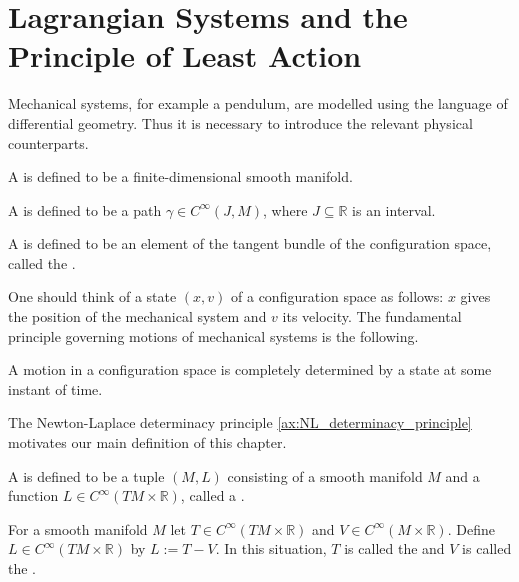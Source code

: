 \section*{Lagrangian Systems and the Principle of Least Action}
Mechanical systems, for example a pendulum, are modelled using the language of differential geometry. Thus it is necessary to introduce the relevant physical counterparts. 

\begin{definition}
	A  is defined to be a finite-dimensional smooth manifold.
\end{definition}

\begin{definition}[Motion]
	A  is defined to be a path $\gamma \in C^\infty(J, M)$, where $J \subseteq \mathbb{R}$ is an interval.
\end{definition}

\begin{definition}[State]
	A  is defined to be an element of the tangent bundle of the configuration space, called the .
\end{definition}

One should think of a state $(x,v)$ of a configuration space as follows: $x$ gives the position of the mechanical system and $v$ its velocity. The fundamental principle governing motions of mechanical systems is the following.

\begin{axiom}
	\label{ax:NL_determinacy_principle}
	A motion in a configuration space is completely determined by a state at some instant of time.
\end{axiom}

The Newton-Laplace determinacy principle \ref{ax:NL_determinacy_principle} motivates our main definition of this chapter.

\begin{definition}
	A  is defined to be a tuple $(M,L)$ consisting of a smooth manifold $M$ and a function $L \in C^\infty(TM \times \mathbb{R})$, called a .
\end{definition}

\begin{example}
	\label{ex:Lagrangian}
	For a smooth manifold $M$ let $T \in C^\infty(TM \times \mathbb{R})$ and $V \in C^\infty(M \times \mathbb{R})$. Define $L \in C^\infty(TM \times \mathbb{R})$ by $L := T - V$. In this situation, $T$ is called the  and $V$ is called the .
\end{example}

